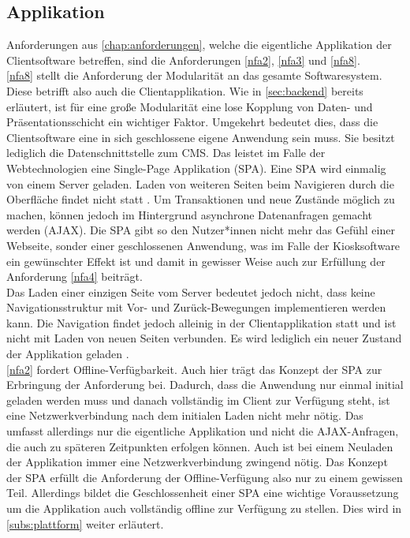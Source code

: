 \subsection{Applikation}
\label{subs:applikation}

Anforderungen aus \autoref{chap:anforderungen}, welche die eigentliche Applikation 
der Clientsoftware betreffen, sind die Anforderungen \ref{nfa2}, \ref{nfa3} und \ref{nfa8}.\\

\ref{nfa8} stellt die Anforderung der Modularität an das gesamte Softwaresystem. Diese
betrifft also auch die Clientapplikation. Wie in \autoref{sec:backend} bereits erläutert, 
ist für eine große Modularität eine lose Kopplung von Daten- und Präsentationsschicht ein
wichtiger Faktor. Umgekehrt bedeutet dies, dass die Clientsoftware eine in sich geschlossene
eigene Anwendung sein muss. Sie besitzt lediglich die Datenschnittstelle zum CMS. Das leistet im 
Falle der Webtechnologien eine Single-Page Applikation (SPA). Eine SPA wird einmalig von einem 
Server geladen. Laden von weiteren Seiten beim Navigieren durch die Oberfläche 
findet nicht statt \cite{js-definitive}. Um Transaktionen und neue Zustände möglich zu machen,
können jedoch im Hintergrund asynchrone Datenanfragen gemacht werden (AJAX). 
Die SPA gibt so den Nutzer*innen nicht mehr das Gefühl einer
Webseite, sonder einer geschlossenen Anwendung, was im Falle der Kiosksoftware ein gewünschter
Effekt ist und damit in gewisser Weise auch zur Erfüllung der Anforderung \ref{nfa4} beiträgt.\\
Das Laden einer einzigen Seite vom Server bedeutet jedoch nicht, dass keine Navigationsstruktur
mit Vor- und Zurück-Bewegungen implementieren werden kann. Die Navigation findet jedoch alleinig in 
der Clientapplikation statt und ist nicht mit Laden von neuen Seiten verbunden. Es wird lediglich
ein neuer Zustand der Applikation geladen \cite{spa-manifesto}.\\

\ref{nfa2} fordert Offline-Verfügbarkeit. Auch hier trägt das Konzept der SPA zur 
Erbringung der Anforderung bei. Dadurch, dass die Anwendung nur einmal initial geladen werden muss 
und danach vollständig im Client zur Verfügung steht, ist eine Netzwerkverbindung nach dem initialen 
Laden nicht mehr nötig. Das umfasst allerdings nur die eigentliche Applikation und nicht die
AJAX-Anfragen, die auch zu späteren Zeitpunkten erfolgen können. Auch ist bei einem Neuladen
der Applikation immer eine Netzwerkverbindung zwingend nötig. Das Konzept der SPA erfüllt
die Anforderung der Offline-Verfügung also nur zu einem gewissen Teil. Allerdings bildet die Geschlossenheit
einer SPA eine wichtige Voraussetzung um die Applikation auch vollständig offline zur Verfügung
zu stellen. Dies wird in \autoref{subs:plattform} weiter erläutert.\\


